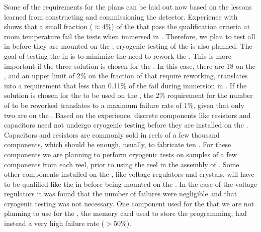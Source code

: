Some of the requirements for the  plans can
be laid out now based on the lessons learned
from constructing and commissioning the 
detector. Experience with  shows that a small fraction
($\approx4$\%) of the   that pass the
qualification criteria at room temperature fail the tests
when immersed in \lntwo. Therefore, we plan to test all  in \lntwo
before they are mounted on the ; 
cryogenic testing of the  is also planned. The goal of testing 
the  in \lntwo is to minimize the need
to rework the . This is more important if 
the three  solution is chosen for the
. In this case, there are 18  on the
, and an upper limit of 2\% on the fraction of
 that require reworking, translates into a requirement 
that less than 0.11\% of the  fail during immersion in \lntwo.
If the  solution is chosen for the 
to be used on the , the 2\% requirement for the
number of  to be reworked translates to a 
maximum failure rate of 1\%, given that only two
 are on the . Based on the 
experience, discrete components like resistors and capacitors
need not undergo cryogenic testing before they are installed
on the . Capacitors and resistors are commonly
sold in reels of a few thousand components, which
should be enough, usually, to fabricate ten
. For these components we are planning to
perform cryogenic tests on samples of a few components
from each reel, prior to using the reel in the assembly of
. Some other components installed on
the , like voltage regulators and crystals, 
will have to be qualified like the 
in \lntwo before being mounted on the . In the
case of the voltage regulators it was found that the number
of failures were negligible and that cryogenic testing was
not necessary. One component used for the 
that we are not planning to use for the  ,
the memory card used to store the  programming,
had instead a very high failure rate ($>50$\%).


